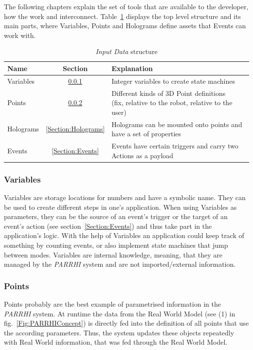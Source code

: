 The following chapters explain the set of tools that are available to the developer, how the work and interconnect. Table~\ref{Table:InputDataStructure} displays the top level structure and its main parts, where Variables, Points and Holograms define assets that Events can work with. 

\begin{table}[ht]
	\caption{\textit{Input Data} structure}
	\label{Table:InputDataStructure}
	\centering
	\begin{tabular}{lcl}
		\toprule
		Name & Section		& Explanation	\\		
		\midrule
		Variables & \ref{Section:Variables}		& Integer variables to create state machines \\
		Points& \ref{Section:Points}		& \parbox[t]{10cm}{Different kinds of 3D Point definitions\\(fix, relative to the robot, relative to the user)} 	 \\
		Holograms& \ref{Section:Holograms} & Holograms can be mounted onto points and have a set of properties\\
		Events& \ref{Section:Events} & Events have certain triggers and carry two Actions as a payload \\
		\bottomrule
	\end{tabular}
\end{table}

\subsubsection{Variables}\label{Section:Variables}
Variables are storage locations for numbers and have a symbolic name. They can be used to create different steps in one's application. When using Variables as parameters, they can be the source of an event's trigger or the target of an event's action (see section~\ref{Section:Events}) and thus take part in the application's logic. With the help of Variables an application could keep track of something by counting events, or also implement state machines that jump between modes. Variables are internal knowledge, meaning, that they are managed by the \textit{PARRHI} system and are not imported/external information.

\subsubsection{Points}\label{Section:Points}
Points probably are the best example of parametrised information in the \textit{PARRHI} system. At runtime the data from the Real World Model (see (1) in fig.~\ref{Fig:PARRHIConcept}) is directly fed into the definition of all points that use the according parameters. Thus, the system updates these objects repeatedly with Real World information, that was fed through the Real World Model.
 
